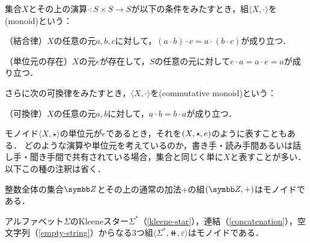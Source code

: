 \documentclass{ltjsbook}
\begin{document}
\begin{thmbox}
\begin{definition} 集合\(X\)とその上の演算\(\mathord{\cdot}\colon S \times S \to S\)が以下の条件をみたすとき，組\(\langle X, \mathord{\cdot} \rangle\)を(monoid)という：
\begin{conditions}
    \item （結合律）\(X\)の任意の元\(a, b, c\)に対して，\((a \cdot b) \cdot c = a \cdot (b \cdot c)\)が成り立つ．
    \item （単位元の存在）\(X\)の元\(e\)が存在して，\(S\)の任意の元に対して\(e \cdot a = a \cdot e = a\)が成り立つ．
\end{conditions}
さらに次の可換律をみたすとき，\(\langle X, \mathord{\cdot} \rangle\)を(commutative monoid)という：
\begin{conditions}[resume]
    \item （可換律）\(X\)の任意の元\(a, b\)に対して，\(a \cdot b = b \cdot a\)が成り立つ．
\end{conditions}
\end{definition}
\end{thmbox}

モノイド\(\langle X, \mathord{\star} \rangle\)の単位元が\(e\)であるとき，それを\(( X, \mathord{\star}, e )\)のように表すこともある．
どのような演算や単位元を考えているのか，書き手・読み手間あるいは話し手・聞き手間で共有されている場合，集合と同じく単に\(X\)と表すことが多い．以下この種の注釈は省く．

\begin{example} 整数全体の集合\(\Integer\)とその上の通常の加法\(\mathord{+}\)の組\(\tuple{\Integer, \mathord{+} }\)はモノイドである．
\end{example}

\begin{example} アルファベット\(\Sigma\)のKleeneスター\(\Sigma^{\mathord{*}}\)（\eqref{kleene-star}），連結（\eqref{concatenation}），空文字列（\eqref{empty-string}）からなる3つ組\(\langle \Sigma^{\mathord{*}}, \doubleplus, \varepsilon \rangle\)はモノイドである．
\end{example}
\end{document}
